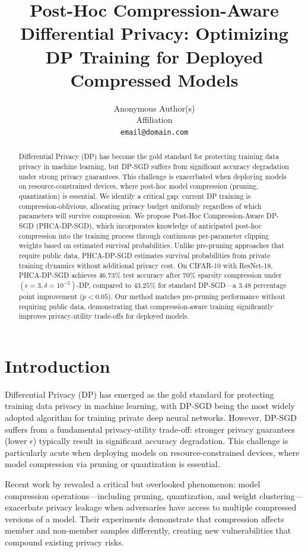 \documentclass[11pt,a4paper]{article}
\title{Post-Hoc Compression-Aware Differential Privacy: Optimizing DP Training for Deployed Compressed Models}
\author{
  Anonymous Author(s) \\
  Affiliation \\
  \texttt{email@domain.com}
}
\begin{document}
\maketitle

\begin{abstract}
Differential Privacy (DP) has become the gold standard for protecting training data privacy in machine learning, but DP-SGD suffers from significant accuracy degradation under strong privacy guarantees. This challenge is exacerbated when deploying models on resource-constrained devices, where post-hoc model compression (pruning, quantization) is essential. We identify a critical gap: current DP training is compression-oblivious, allocating privacy budget uniformly regardless of which parameters will survive compression. We propose Post-Hoc Compression-Aware DP-SGD (PHCA-DP-SGD), which incorporates knowledge of anticipated post-hoc compression into the training process through continuous per-parameter clipping weights based on estimated survival probabilities. Unlike pre-pruning approaches that require public data, PHCA-DP-SGD estimates survival probabilities from private training dynamics without additional privacy cost. On CIFAR-10 with ResNet-18, PHCA-DP-SGD achieves $46.73\%$ test accuracy after 70\% sparsity compression under $(\epsilon=3, \delta=10^{-5})$-DP, compared to $43.25\%$ for standard DP-SGD---a $3.48$ percentage point improvement ($p<0.05$). Our method matches pre-pruning performance without requiring public data, demonstrating that compression-aware training significantly improves privacy-utility trade-offs for deployed models.
\end{abstract}

\section{Introduction}

Differential Privacy (DP) \citep{dwork2006calibrating} has emerged as the gold standard for protecting training data privacy in machine learning, with DP-SGD \citep{abadi2016deep} being the most widely adopted algorithm for training private deep neural networks. However, DP-SGD suffers from a fundamental privacy-utility trade-off: stronger privacy guarantees (lower $\epsilon$) typically result in significant accuracy degradation. This challenge is particularly acute when deploying models on resource-constrained devices, where model compression via pruning or quantization is essential.

Recent work by \citet{li2025compleak} revealed a critical but overlooked phenomenon: model compression operations---including pruning, quantization, and weight clustering---exacerbate privacy leakage when adversaries have access to multiple compressed versions of a model. Their experiments demonstrate that compression affects member and non-member samples differently, creating new vulnerabilities that compound existing privacy risks.
\end{document}
